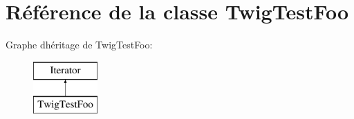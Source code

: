 \hypertarget{class_twig_test_foo}{}\section{Référence de la classe Twig\+Test\+Foo}
\label{class_twig_test_foo}
Graphe d\textquotesingle{}héritage de Twig\+Test\+Foo\+:\begin{figure}[H]
\begin{center}
\leavevmode
\includegraphics[height=2.000000cm]{class_twig_test_foo}
\end{center}
\end{figure}
